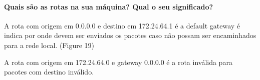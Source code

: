 \paragraph{Quais são as rotas na sua máquina? Qual o seu significado?}
A rota com origem em 0.0.0.0 e  destino em 172.24.64.1 é a default gateway é indica por onde devem ser enviados os pacotes caso não possam ser encaminhados para a rede local. (Figure 19)

A rota com origem em 172.24.64.0 e gateway 0.0.0.0 é a rota inválida para pacotes com destino inválido.